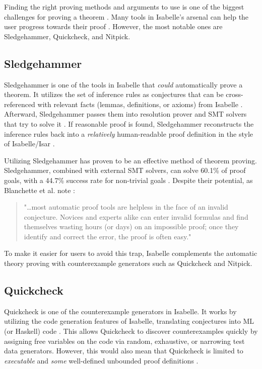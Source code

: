 Finding the right proving methods and arguments to use is one of the biggest challenges for proving a theorem \cite{isabelleProof}. 
Many tools in Isabelle's arsenal can help the user progress towards their proof \cite{IsabelleHOL}. However, the most notable ones are 
Sledgehammer, Quickcheck, and Nitpick.

\subsection{Sledgehammer}
\label{sec:Sledgehammer}

Sledgehammer is one of the tools in Isabelle that \emph{could} automatically prove a theorem. It utilizes the set of inference rules as 
conjectures that can be cross-referenced with relevant facts (lemmas, definitions, or axioms) from Isabelle \cite[Sec. 3]{isabelleProof}. 
Afterward, Sledgehammer passes them into resolution prover and SMT solvers that try to solve it \cite[Sec. 3.3]{isabelleProof}. If reasonable 
proof is found, Sledgehammer reconstructs the inference rules back into a \emph{relatively} human-readable proof definition in the style of 
Isabelle/Isar \cite[Sec. 3.4]{isabelleProof}.

Utilizing Sledgehammer has proven to be an effective method of theorem proving. Sledgehammer, combined with external SMT solvers, can 
solve 60.1\% of proof goals, with a 44.7\% success rate for non-trivial goals \cite[Sec. 6]{isabelleSledgehammerSMT}. Despite their 
potential, as Blanchette et al. note \cite[p. 2]{isabelleProof}:

\begin{quote}
    "\dots most automatic proof tools are helpless in the face of an invalid conjecture. Novices and experts alike can enter invalid formulas and 
    find themselves wasting hours (or days) on an impossible proof; once they identify and correct the error, the proof is often easy."
\end{quote}

To make it easier for users to avoid this trap, Isabelle complements the automatic theory proving with counterexample generators such as Quickcheck 
and Nitpick.

\subsection{Quickcheck}
\label{sec:Quickcheck}

Quickcheck is one of the counterexample generators in Isabelle. It works by utilizing the code generation features of Isabelle, translating 
conjectures into ML (or Haskell) code \cite{isabelleQuickcheck}. This allows Quickcheck to discover counterexamples quickly by assigning 
free variables on the code via random, exhaustive, or narrowing test data generators. However, this would also mean that Quickcheck is limited 
to \emph{executable} and \emph{some} well-defined unbounded proof definitions \cite{isabelleQuickcheck}.

